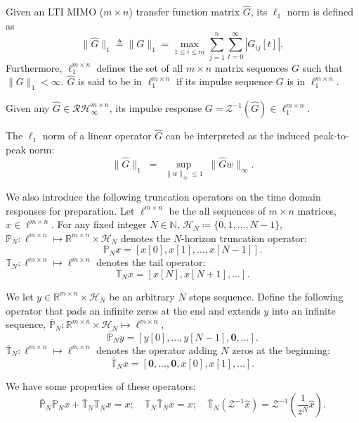 \begin{defn}
Given an LTI MIMO (\(m\times n\)) transfer function matrix \(\hat{G}\), its \(\ell_1\) norm is defined as
\begin{equation}
    \|\hat{G}\|_1 \triangleq \|G\|_1 =  \underset{1\leq i\leq m}{\max} \sum_{j=1}^n \sum_{t=0}^\infty |G_{ij}[t]|,
\end{equation}
Furthermore, \(\ell_1^{m\times n}\) defines the set of all \(m\times n\) matrix sequences \(G\) such that \(\|G\|_1 < \infty\). \(\hat{G}\) is said to be in \(\ell_1^{m\times n}\) if its impulse sequence \(G\) is in \(\ell_1^{m\times n}\).
\end{defn}
\begin{rem}
Given any \(\hat{G}\in \mathcal{RH}_\infty^{m\times n}\), its impulse response \(G = \mathcal{Z}^{-1}(\hat{G}) \in \ell_1^{m\times n}\).
\end{rem}
\begin{rem}
The $\ell_1$ norm of a linear operator $\hat{G}$ can be interpreted as the induced peak-to-peak norm:
\begin{equation}
    \|\hat{G}\|_{1} \;=\; \sup_{\|w\|_{\infty} \leq 1} \;\|\hat{G}w\|_{\infty}.
\end{equation}
\end{rem}


We also introduce the following truncation operators on the time domain responses for preparation.
Let \(\ell^{m\times n}\) be the all sequences of \(m \times n\) matrices, \(x\in\ell^{m\times n}\).
For any fixed integer \(N\in \mathbb{N}\), \(\mathcal{H}_N \coloneqq \{0,1,\hdots,N-1\}\), \(\mathbb{P}_N:\ell^{m\times n} \mapsto \mathbb{R}^{m\times n}\times \mathcal{H}_N\) denotes the \(N\)-horizon truncation operator:
\[
\mathbb{P}_N x = 
\left[x[0],x[1],\hdots,x[N-1]\right].
\]
\(\mathbb{T}_N:\ell^{m\times n} \mapsto \ell^{m\times n}\) denotes the tail operator:
\[
\mathbb{T}_N x = 
\left[x[N],x[N+1],\hdots\right].
\]

We let \(y\in \mathbb{R}^{m\times n} \times \mathcal{H}_N\) be an arbitrary \(N\) steps sequence. Define the following operator that pads an infinite zeros at the end and extends \(y\) into an infinite sequence, 
\(\bar{\mathbb{P}}_N: \mathbb{R}^{m\times n} \times \mathcal{H}_N \mapsto \ell^{m\times n}\),
\[
\bar{\mathbb{P}}_N y = 
\left[y[0],\hdots,y[N-1],\mathbf{0},\hdots\right].
\]
\(\bar{\mathbb{T}}_N:\ell^{m\times n} \mapsto \ell^{m\times n}\) denotes the operator adding \(N\) zeros at the beginning:
\[
\bar{\mathbb{T}}_N x = 
\left[\mathbf{0},\hdots,\mathbf{0},x[0],x[1],\hdots\right].
\]
\begin{prop}
We have some properties of these operators:
\[
\bar{\mathbb{P}}_N\mathbb{P}_N x +\bar{\mathbb{T}}_N\mathbb{T}_N x =x;\quad \mathbb{T}_N \bar{\mathbb{T}}_N x = x;\quad \bar{\mathbb{T}}_N (\mathcal{Z}^{-1} \hat{x}) = \mathcal{Z}^{-1}(\frac{1}{z^N} \hat{x}). 
\]
  
\end{prop}

